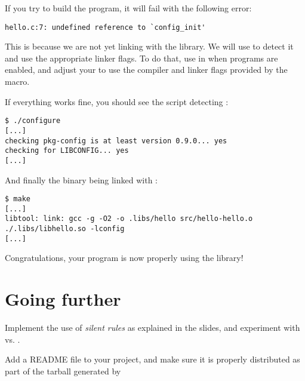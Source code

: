 If you try to build the program, it will fail with the following
error:

\begin{verbatim}
hello.c:7: undefined reference to `config_init'
\end{verbatim}

This is because we are not yet linking with the 
library. We will use  to detect it and use the
appropriate linker flags. To do that, use  in
 when programs are enabled, and adjust your
 to use the compiler and linker flags provided by
the  macro.

If everything works fine, you should see the  script
detecting :

\begin{verbatim}
$ ./configure
[...]
checking pkg-config is at least version 0.9.0... yes
checking for LIBCONFIG... yes
[...]
\end{verbatim}

And finally the  binary being linked with
:

\begin{verbatim}
$ make
[...]
libtool: link: gcc -g -O2 -o .libs/hello src/hello-hello.o  ./.libs/libhello.so -lconfig
[...]
\end{verbatim}

Congratulations, your program is now properly using the
 library!

\section{Going further}

Implement the use of {\em silent rules} as explained in the slides,
and experiment with  vs. .

Add a README file to your project, and make sure it is properly
distributed as part of the tarball generated by 
